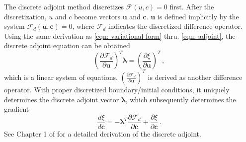 The discrete adjoint method \cite{discrete adjoint}
discretizes $\mathcal{F}(u,c)=0$ first. After the discretization, $u$ and $c$ become
vectors $\boldsymbol{u}$ and $\boldsymbol{c}$.
$\boldsymbol{u}$ is defined implicitly by the system
$\mathcal{F}_d(\boldsymbol{u}, \boldsymbol{c}) = 0$, where $\mathcal{F}_d$ indicates
the discretized difference operator. Using the same derivation as \eqref{eqn: variational form}
thru. \eqref{eqn: adjoint}, the discrete adjoint equation can be obtained
\begin{equation}
    \left(\frac{\partial \mathcal{F}_d}{\partial \boldsymbol{u}}\right)^T \boldsymbol{\lambda} = \left(\frac{\partial \xi}{\partial \boldsymbol{u}}\right)^T\,,
    \label{eqn: adjoint discrete}
\end{equation}
which is a linear system of equations.
$\left(\frac{\partial \mathcal{F}_d}{\partial \boldsymbol{u}}\right)^T$ is derived as
another difference operator. With proper discretized boundary/initial conditions, it uniquely
determines the discrete adjoint vector $\boldsymbol{\lambda}$, which subsequently determines the
gradient
\begin{equation}
    \frac{d\xi}{d\boldsymbol{c}} = - \boldsymbol{\lambda}^T \frac{\partial \mathcal{F}_d}{\partial \boldsymbol{c}} + \frac{\partial \xi}{\partial \boldsymbol{c}}
\,.
    \label{eqn: dxidc adjoint discrete}
\end{equation}
See Chapter 1 of \cite{discrete adjoint phd} for a detailed derivation of the discrete adjoint.\\

